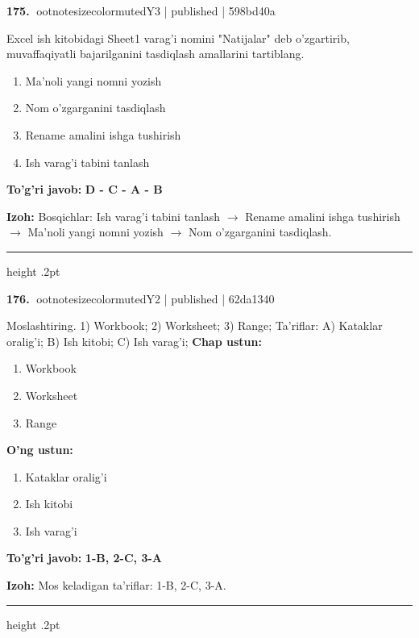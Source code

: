 \documentclass[10pt,a4paper]{article}
\begin{document}
\textbf{\color{ink}175.} {ootnotesizecolor{muted}Y3 | published | 598bd40a}
\par
Excel ish kitobidagi Sheet1 varag'i nomini "Natijalar" deb o'zgartirib, muvaffaqiyatli bajarilganini tasdiqlash amallarini tartiblang.
\begin{enumerate}[label=\Alph*),leftmargin=9mm]
\item Ma'noli yangi nomni yozish
\item Nom o'zgarganini tasdiqlash
\item Rename amalini ishga tushirish
\item Ish varag'i tabini tanlash
\end{enumerate}
\begin{tcolorbox}[enhanced,breakable,colback=teal!4,colframe=teal!55!black,boxrule=0.45pt,arc=1.2mm,left=2.8mm,right=2.8mm,top=2mm,bottom=2mm]
\textbf{\color{teal}To'g'ri javob:} \textbf{D - C - A - B}
\par\smallskip
\textbf{Izoh:} Bosqichlar: Ish varag'i tabini tanlash \ensuremath{\rightarrow} Rename amalini ishga tushirish \ensuremath{\rightarrow} Ma'noli yangi nomni yozish \ensuremath{\rightarrow} Nom o'zgarganini tasdiqlash.
\end{tcolorbox}
\vspace{2mm}\hrule height .2pt\vspace{2mm}

\textbf{\color{ink}176.} {ootnotesizecolor{muted}Y2 | published | 62da1340}
\par
Moslashtiring.  1) Workbook;  2) Worksheet;  3) Range;  Ta'riflar: A) Kataklar oralig'i;  B) Ish kitobi;  C) Ish varag'i;
\textbf{Chap ustun:}\begin{enumerate}[label=\arabic*),leftmargin=9mm]
\item Workbook
\item Worksheet
\item Range
\end{enumerate}
\textbf{O'ng ustun:}\begin{enumerate}[label=\Alph*),leftmargin=9mm]
\item Kataklar oralig'i
\item Ish kitobi
\item Ish varag'i
\end{enumerate}
\begin{tcolorbox}[enhanced,breakable,colback=teal!4,colframe=teal!55!black,boxrule=0.45pt,arc=1.2mm,left=2.8mm,right=2.8mm,top=2mm,bottom=2mm]
\textbf{\color{teal}To'g'ri javob:} \textbf{1-B, 2-C, 3-A}
\par\smallskip
\textbf{Izoh:} Mos keladigan ta'riflar: 1-B, 2-C, 3-A.
\end{tcolorbox}
\vspace{2mm}\hrule height .2pt\vspace{2mm}
\end{document}
